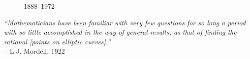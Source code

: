 \begin{frame}[plain] 
	\begin{minipage}{0.2\textwidth}
 	\begin{figure}[h]
	\centering
	 \par
	{\small 1888--1972}
	\end{figure}
	\end{minipage}%
	\begin{minipage}{0.8\textwidth}
	\begin{center}
	{\itshape ``Mathematicians have been familiar with very few questions for so long a period with so little accomplished in the way of general results, as that of finding the rational [points on elliptic curves].''} \\
	 \phantom{x}\hfill-- L.J. Mordell, 1922
	\end{center}
 	\end{minipage}
\end{frame}





